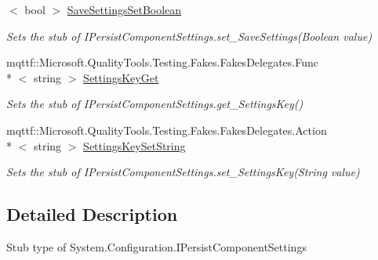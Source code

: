 \begin{DoxyCompactItemize}
$<$ bool $>$ \hyperlink{class_system_1_1_configuration_1_1_fakes_1_1_stub_i_persist_component_settings_a88630acc7f683cd95c66b6fe9c04c1b9}{Save\-Settings\-Set\-Boolean}
\begin{DoxyCompactList}\small\item\em Sets the stub of I\-Persist\-Component\-Settings.\-set\-\_\-\-Save\-Settings(\-Boolean value)\end{DoxyCompactList}\item 
mqttf\-::\-Microsoft.\-Quality\-Tools.\-Testing.\-Fakes.\-Fakes\-Delegates.\-Func\\*
$<$ string $>$ \hyperlink{class_system_1_1_configuration_1_1_fakes_1_1_stub_i_persist_component_settings_acc23c0ce52c99ce896d7e174e93e2e7c}{Settings\-Key\-Get}
\begin{DoxyCompactList}\small\item\em Sets the stub of I\-Persist\-Component\-Settings.\-get\-\_\-\-Settings\-Key()\end{DoxyCompactList}\item 
mqttf\-::\-Microsoft.\-Quality\-Tools.\-Testing.\-Fakes.\-Fakes\-Delegates.\-Action\\*
$<$ string $>$ \hyperlink{class_system_1_1_configuration_1_1_fakes_1_1_stub_i_persist_component_settings_a7b4b476e259ac7eb200924f971ec6455}{Settings\-Key\-Set\-String}
\begin{DoxyCompactList}\small\item\em Sets the stub of I\-Persist\-Component\-Settings.\-set\-\_\-\-Settings\-Key(\-String value)\end{DoxyCompactList}\end{DoxyCompactItemize}


\subsection{Detailed Description}
Stub type of System.\-Configuration.\-I\-Persist\-Component\-Settings



